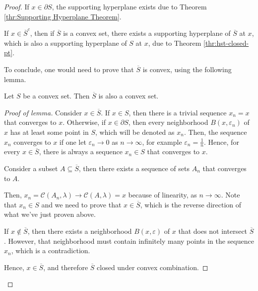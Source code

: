 \begin{proof}
  If \( x \in \partial S \), the supporting hyperplane exists due to Theorem
  \ref{thr:Supporting Hyperplane Theorem}.

  If \( x \in \overline{S}^{c} \), then if \(\overline{S} \) is a convex set,
  there exists a supporting hyperplane of \( \overline{S} \) at \( x \), which
  is also a supporting hyperplane of \( S \) at \( x \), due to Theorem
  \ref{thr:hst-closed-pt}.

  To conclude, one would need to prove that \( \overline{S} \) is convex, using
  the following lemma.
  \begin{lemma}
    Let \( S \) be a convex set. Then \( \overline{S} \) is also a convex set.
  \end{lemma}

  \begin{proof}[Proof of lemma]
    Consider \( x \in \overline{S} \). If \( x \in S \), then there is a trivial
    sequence \( x_{n} = x \) that converges to \( x \). Otherwise, if \( x \in
    \partial S \), then every neighborhood \( B(x, \varepsilon_{n}) \) of \( x
    \) has at least some point in \( S \), which will be denoted as \( x_{n} \).
    Then, the sequence \( x_{n} \) converges to \( x \) if one let \(
    \varepsilon_{n} \to  0 \) as \( n \to  \infty \), for example \(
    \varepsilon_{n} = \frac{1}{n} \). Hence, for every \( x \in \overline{S} \),
    there is always a sequence \( x_{n} \in S \) that converges to \( x \).

    Consider a subset \( A \subseteq \overline{S} \), then there exists a
    sequence of sets \( A_{n} \) that converges to \( A \).

    Then, \( x_{n} = \mathcal{C}(A_{n}, \lambda) \to  \mathcal{C}(A, \lambda) =
    x\) because of linearity, as \( n \to  \infty \). Note that \( x_{n} \in S
    \) and we need to prove that \( x \in \overline{S} \), which is the reverse
    direction of what we've just proven above.

    If \( x \notin \overline{S} \), then there exists a neighborhood \( B(x,
    \varepsilon) \) of \( x \) that does not intersect \( \overline{S} \).
    However, that neighborhood must contain infinitely many points in the
    sequence \( x_{n} \), which is a contradiction.

    Hence, \( x \in \overline{S} \), and therefore \( \overline{S} \) closed
    under convex combination.
  \end{proof}
\end{proof}

